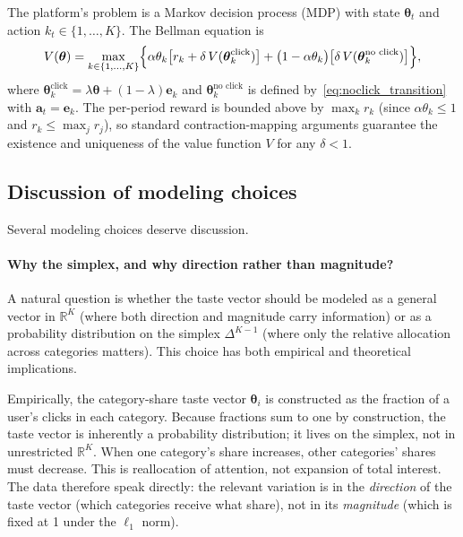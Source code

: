 \documentclass[11pt]{article}
\newcommand{\R}{\mathbb{R}}
\begin{document}
The platform's problem is a Markov decision process (MDP) with state $\boldsymbol{\theta}_t$ and action $k_t \in \{1, \ldots, K\}$. The Bellman equation is
\begin{equation}\label{eq:bellman}
V(\boldsymbol{\theta}) = \max_{k \in \{1,\ldots,K\}} \Bigl\{
\alpha \theta_k \bigl[r_k + \delta \, V(\boldsymbol{\theta}^{\text{click}}_k)\bigr]
+ \bigl(1 - \alpha \theta_k\bigr) \bigl[\delta \, V(\boldsymbol{\theta}^{\text{no click}}_k)\bigr]
\Bigr\},
\end{equation}
where $\boldsymbol{\theta}^{\text{click}}_k = \lambda \boldsymbol{\theta} + (1-\lambda)\mathbf{e}_k$ and $\boldsymbol{\theta}^{\text{no click}}_k$ is defined by~\eqref{eq:noclick_transition} with $\mathbf{a}_t = \mathbf{e}_k$. The per-period reward is bounded above by $\max_k r_k$ (since $\alpha \theta_k \le 1$ and $r_k \le \max_j r_j$), so standard contraction-mapping arguments guarantee the existence and uniqueness of the value function $V$ for any $\delta < 1$.

\subsection{Discussion of modeling choices}

Several modeling choices deserve discussion.

\paragraph{Why the simplex, and why direction rather than magnitude?} A natural question is whether the taste vector should be modeled as a general vector in $\R^K$ (where both direction and magnitude carry information) or as a probability distribution on the simplex $\Delta^{K-1}$ (where only the relative allocation across categories matters). This choice has both empirical and theoretical implications.

Empirically, the category-share taste vector $\boldsymbol{\theta}_i$ is constructed as the fraction of a user's clicks in each category. Because fractions sum to one by construction, the taste vector is inherently a probability distribution; it lives on the simplex, not in unrestricted $\R^K$. When one category's share increases, other categories' shares must decrease. This is reallocation of attention, not expansion of total interest. The data therefore speak directly: the relevant variation is in the \emph{direction} of the taste vector (which categories receive what share), not in its \emph{magnitude} (which is fixed at 1 under the $\ell_1$ norm).
\end{document}
